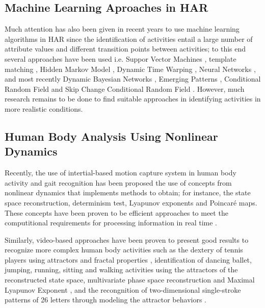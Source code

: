 \documentclass{sigchi}
\begin{document}
\subsection{Machine Learning Aproaches in HAR}
Much attention has also been given in recent years to use machine learning 
algorithms in HAR since the identification of activities entail a large number of 
attribute values and different transition points between activities;
to this end several approaches have been used i.e. 
Suppor Vector Machines \cite{J.FrankS.Mannor2010, Sama2013, Schuldt2004},
template matching \cite{Nguyen2009,Lin2007}, 
Hidden Markov Model 
\cite{Kohn2012,Niu2004,Chen2003,Bernardin2003,Eickeler1998,Chang2000},
Dynamic Time Warping \cite{Bautista2013,Boulgouris2004,Celebi2011},
Neural Networks \cite{Rosenblum1994,Ji2013,Modi2011,Boesnach2004},
and  most recently Dynamic Bayesian Networks \cite{Cuaya2013, Wang2014}, 
Emerging Patterns \cite{Tao2009, Kim2010},
Conditional Random Field  \cite{Wang2006} and
Skip Change Conditional Random Field \cite{Kim2010}. 
However, much research remains to be done to find suitable approaches 
in identifying activities in more realistic conditions.


\subsection{Human Body Analysis Using Nonlinear Dynamics}

Recently, the use of intertial-based motion capture system in human body activity 
and gait recognition has been proposed the use of concepts from nonlinear dynamics 
that implements methods to obtain; for instance, the state space reconstruction,
determinism test, Lyapunov exponents and Poincar\'e maps.
These concepts have been proven to be efficient approaches to meet the computitional 
requirements for processing information in real time
\cite{J.FrankS.Mannor2010, Sama2013, Gouwanda2012,Perc2005, Akiduki2013,Akiduki2014}. 

Similarly, video-based approaches have been proven to present good results 
to recognize more complex human body activities such as the dextery of tennis players 
using attractors and fractal properties \cite{Yamamoto2000,Suzuki2013} 
, identification of dancing ballet, jumping, running, sitting and walking activities
using the attractors of the reconstructed state space, 
multivariate phase space reconstruction
and Maximal Lyapunov Exponent 
\cite{Ali2007,Basharat2009,Venkataraman2013}, and the recongnition of 
two-dimensional single-stroke patterns of 26 letters 
through modeling the attractor behaviors \cite{Ijspeert2013}. 
\end{document}
